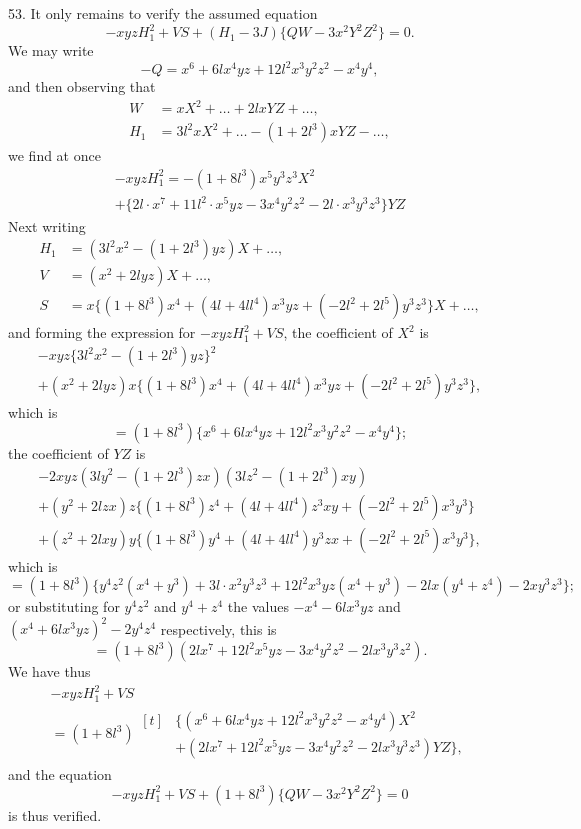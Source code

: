 \documentclass[11pt,a4paper]{article}
\theoremstyle{definition}
\begin{document}
53. It only remains to verify the assumed equation
\[
-xyzH_1^2+VS+(H_1-3J)\{QW-3x^2Y^2Z^2\}=0.
\]
We may write
\[
-Q=x^6+6lx^4yz+12l^2x^3y^2z^2-x^4y^4,
\]
and then observing that
\begin{align*}
W &= xX^2+\ldots+2lxYZ+\ldots,\\
H_1 &= 3l^2xX^2+\ldots-(1+2l^3)xYZ-\ldots,
\end{align*}
we find at once
\begin{multline*}
-xyzH_1^2=-(1+8l^3)x^5y^3z^3X^2\\
+\{2l\cdot x^7+11l^2\cdot x^5yz-3x^4y^2z^2-2l\cdot x^3y^3z^3\}YZ
\end{multline*}
Next writing
\begin{align*}
H_1 &= (3l^2x^2-(1+2l^3)yz)X+\ldots,\\
V &= (x^2+2lyz)X+\ldots,\\
S &= x\{(1+8l^3)x^4+(4l+4ll^4)x^3yz+(-2l^2+2l^5)y^3z^3\}X+\ldots,
\end{align*}
and forming the expression for $-xyzH_1^2+VS$, the coefficient of $X^2$ is
\begin{multline*}
-xyz\{3l^2x^2-(1+2l^3)yz\}^2\\
+(x^2+2lyz)x\{(1+8l^3)x^4+(4l+4ll^4)x^3yz+(-2l^2+2l^5)y^3z^3\},
\end{multline*}
which is
\[
=(1+8l^3)\{x^6+6lx^4yz+12l^2x^3y^2z^2-x^4y^4\};
\]
the coefficient of $YZ$ is
\begin{multline*}
-2xyz(3ly^2-(1+2l^3)zx)(3lz^2-(1+2l^3)xy)\\
+(y^2+2lzx)z\{(1+8l^3)z^4+(4l+4ll^4)z^3xy+(-2l^2+2l^5)x^3y^3\}\\
+(z^2+2lxy)y\{(1+8l^3)y^4+(4l+4ll^4)y^3zx+(-2l^2+2l^5)x^3y^3\},
\end{multline*}
which is
\[
=(1+8l^3)\{y^4z^2(x^4+y^3)+3l\cdot x^2y^3z^3+12l^2x^3yz(x^4+y^3)-2lx(y^4+z^4)-2xy^3z^3\};
\]
or substituting for $y^4z^2$ and $y^4+z^4$ the values $-x^4-6lx^3yz$ and $(x^4+6lx^3yz)^2-2y^4z^4$ respectively, this is
\[
=(1+8l^3)(2lx^7+12l^2x^5yz-3x^4y^2z^2-2lx^3y^3z^2).
\]
We have thus
\begin{multline*}
-xyzH_1^2+VS\\
=(1+8l^3)\begin{aligned}[t]
&\{(x^6+6lx^4yz+12l^2x^3y^2z^2-x^4y^4)X^2\\
&+(2lx^7+12l^2x^5yz-3x^4y^2z^2-2lx^3y^3z^3)YZ\},
\end{aligned}
\end{multline*}
and the equation
\[
-xyzH_1^2+VS+(1+8l^3)\{QW-3x^2Y^2Z^2\}=0
\]
is thus verified.
\end{document}
